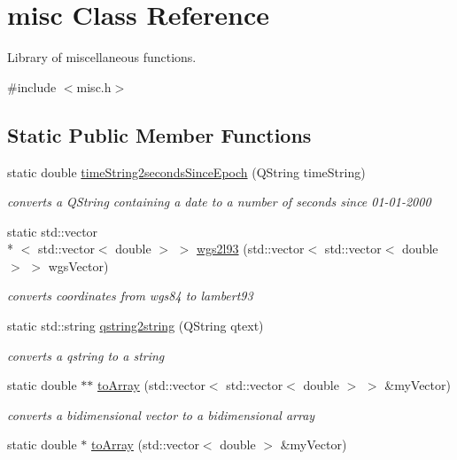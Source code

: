 \hypertarget{classmisc}{\section{misc Class Reference}
\label{classmisc}
}


Library of miscellaneous functions.  




{\ttfamily \#include $<$misc.\+h$>$}

\subsection*{Static Public Member Functions}
\begin{DoxyCompactItemize}
\item 
static double \hyperlink{classmisc_a608031443e98c0e928a6bb6c015a5d42}{time\+String2seconds\+Since\+Epoch} (Q\+String time\+String)
\begin{DoxyCompactList}\small\item\em converts a Q\+String containing a date to a number of seconds since 01-\/01-\/2000 \end{DoxyCompactList}\item 
static std\+::vector\\*
$<$ std\+::vector$<$ double $>$ $>$ \hyperlink{classmisc_acc883f47fd645017a01b64acfef7d939}{wgs2l93} (std\+::vector$<$ std\+::vector$<$ double $>$ $>$ wgs\+Vector)
\begin{DoxyCompactList}\small\item\em converts coordinates from wgs84 to lambert93 \end{DoxyCompactList}\item 
static std\+::string \hyperlink{classmisc_a038d785a1201a45c9007b0d74ba29119}{qstring2string} (Q\+String qtext)
\begin{DoxyCompactList}\small\item\em converts a qstring to a string \end{DoxyCompactList}\item 
static double $\ast$$\ast$ \hyperlink{classmisc_a145eb0cd24980db15f0e892b675fb0d8}{to\+Array} (std\+::vector$<$ std\+::vector$<$ double $>$ $>$ \&my\+Vector)
\begin{DoxyCompactList}\small\item\em converts a bidimensional vector to a bidimensional array \end{DoxyCompactList}\item 
static double $\ast$ \hyperlink{classmisc_a93a4f4d5d68e01eda11362aede08adf4}{to\+Array} (std\+::vector$<$ double $>$ \&my\+Vector)
$$
\end{DoxyCompactItemize}
